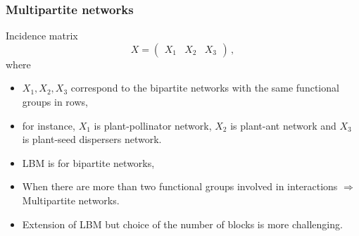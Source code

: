 \documentclass[nopagenumber,9pt]{beamer}
\begin{document}
\begin{frame}
 \frametitle{Multipartite networks}

 Incidence matrix
 $$X=\left(
 \begin{array}{c|c|c}
  X_1&X_2&X_3
 \end{array}
 \right)\,,$$
 where
 \begin{itemize}
  \item $X_1, X_2, X_3$ correspond to the bipartite networks with the same functional groups in rows,
  \item for instance, $X_1$ is plant-pollinator network, $X_2$ is plant-ant network and $X_3$ is plant-seed dispersers network.
 \end{itemize}

 
 
 \bigskip
 
 \begin{itemize}
  \item LBM is for bipartite networks,
  \item When there are more than two functional groups involved in interactions $\Rightarrow$ Multipartite networks.
  \item Extension of LBM but choice of the number of blocks is more challenging.
  
 \end{itemize}


\end{frame}


% 
\end{document}
